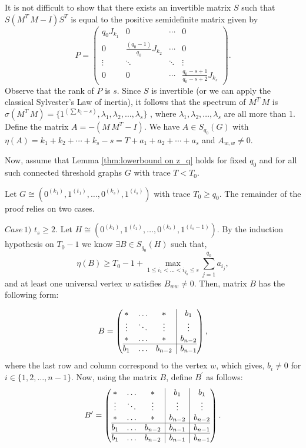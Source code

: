 \documentclass[3p,times,12pt]{article}
\begin{document}
It is not difficult to show that there exists an invertible matrix $S$ such that  $S(M^T\,M-I)S^T$ is equal to the positive semidefinite matrix given by
$$P=\left( \begin{array}{cccc}
    q_0 J_{k_1} & 0 & \cdots & 0 \\[2mm]
    0  & \frac{(q_0-1)}{q_0}J_{k_2} & \cdots &  0  \\
    \vdots & \ddots & \ddots & \vdots \\
     0  & 0 & \cdots & \frac{q_0-s+1}{q_0-s+2} J_{k_s}
  \end{array}
\right).$$ 
Observe that the rank of $P$ is $s$. Since $S$ is invertible (or we can apply the classical Sylvester's Law of inertia), it follows that the
spectrum of $M^T\,M$ is $\sigma(M^T\,M)=\{1^{(\sum k_i-s)}, \lambda_1, \lambda_2, \ldots, \lambda_s\}$ , where $\lambda_1, \lambda_2, \ldots, \lambda_s$ are all more than 1.
Define the matrix $A=-(M\,M^T-I)$. We have $A\in S_{q_0}(G)$ with $\eta(A)=k_1+k_2+\cdots + k_s-s=T+a_1+a_2+\cdots + a_s$ and  $A_{w,w}\neq 0$. 
\vspace{3mm}


Now, assume that Lemma \ref{thm:lowerbound on z_q} holds for fixed $q_0$ and for all such connected threshold graphs $G$ with trace $T < T_0$. 

Let $G\cong (0^{(k_1)}, 1^{(t_1)}, \ldots,0^{(k_s)}, 1^{(t_s)})$ with trace $T_0 \geq q_0$. The remainder of the proof relies on two cases.

\vspace{3mm} 

$Case\, 1)$ $t_s\ge 2$. Let $H\cong (0^{(k_1)}, 1^{(t_1)}, \ldots,0^{(k_s)}, 1^{(t_{s}-1)})$. By the induction hypothesis on $T_0 -1$ we know 
 $\exists B\in S_{q_0}(H)$ such that,
 \begin{equation}\label{}
 \eta(B)\ge T_0-1+\max_{1 \le i_1<\ldots<i_{q_0} \le s} \sum_{j=1}^{q_0} a_{i_j},
 \end{equation}
  and at least one universal vertex $w$ satisfies $B_{ww}\neq 0$. Then, matrix $B$ has the following form:
  
   $$B= \left(\begin{array}{@{}ccc|c@{}}
    * & \ldots & *& b_1  \\
    \vdots & \ddots & \vdots & \vdots  \\
    * & \ldots & * & b_{n-2}  \\\hline
    b_1 & \ldots & b_{n-2} & b_{n-1}  \\
  \end{array}\right),$$  where the last row and column correspond to the vertex $w$, which gives,  $b_i\neq 0$ for $i\in \{1,2,\ldots, n-1\}$. Now, using the matrix $B$, define $B^{\prime}$ as follows: 
 $$B^{\prime}= \left(\begin{array}{@{}ccc|c|c@{}}
    * & \ldots & *& b_1 & b_1 \\
    \vdots & \ddots & \vdots & \vdots & \vdots \\
    * & \ldots & * & b_{n-2} & b_{n-2} \\\hline
    b_1 & \ldots & b_{n-2} & b_{n-1} & b_{n-1} \\\hline
    b_1 & \ldots & b_{n-2} & b_{n-1} & b_{n-1} 
  \end{array}\right).$$
\end{document}
